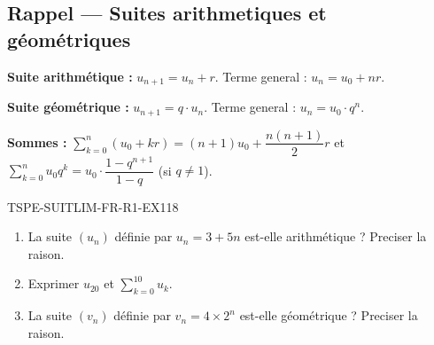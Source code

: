 

\subsection*{Rappel — Suites arithmetiques et géométriques}

\textbf{Suite arithmétique :} $u_{n+1} = u_n + r$. Terme general : $u_n = u_0 + nr$.

\textbf{Suite géométrique :} $u_{n+1} = q \cdot u_n$. Terme general : $u_n = u_0 \cdot q^n$.

\textbf{Sommes :} $\sum_{k=0}^{n} (u_0 + kr) = (n+1)u_0 + \dfrac{n(n+1)}{2}r$ et $\sum_{k=0}^{n} u_0 q^k = u_0 \cdot \dfrac{1-q^{n+1}}{1-q}$ (si $q
\neq 1$).

\begin{exercice}{TSPE-SUITLIM-FR-R1-EX1}{1}{8}
\begin{enumerate}
  \item La suite $(u_n)$ définie par $u_n = 3 + 5n$ est-elle arithmétique ? Preciser la raison.
  \item Exprimer $u_{20}$ et $\sum_{k=0}^{10} u_k$.
  \item La suite $(v_n)$ définie par $v_n = 4 \times 2^n$ est-elle géométrique ? Preciser la raison.
\end{enumerate}
\end{exercice}

